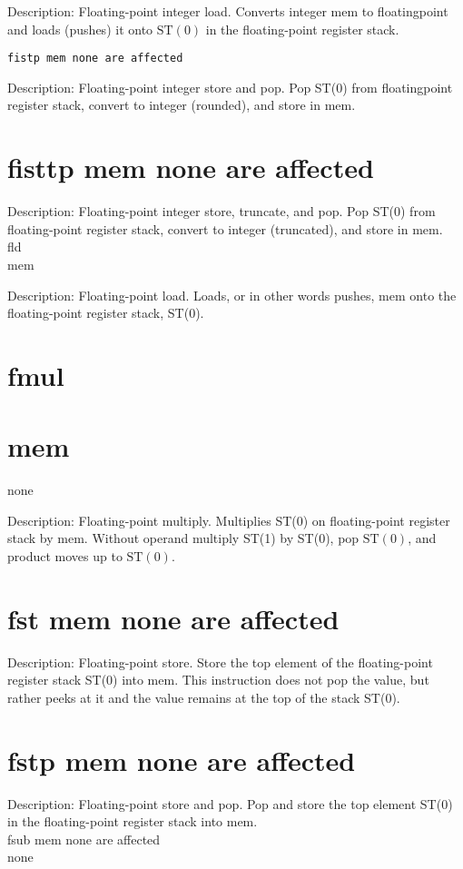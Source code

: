 \documentclass[10pt]{article}
\begin{document}
Description: Floating-point integer load. Converts integer mem to floatingpoint and loads (pushes) it onto $\mathrm{ST}(0)$ in the floating-point register stack.

\begin{verbatim}
fistp mem none are affected
\end{verbatim}

Description: Floating-point integer store and pop. Pop ST(0) from floatingpoint register stack, convert to integer (rounded), and store in mem.

\section*{fisttp mem none are affected}
Description: Floating-point integer store, truncate, and pop. Pop ST(0) from floating-point register stack, convert to integer (truncated), and store in mem.\\
fld\\
mem

Description: Floating-point load. Loads, or in other words pushes, mem onto the floating-point register stack, ST(0).

\section*{fmul}
\section*{mem}
none

Description: Floating-point multiply. Multiplies ST(0) on floating-point register stack by mem. Without operand multiply ST(1) by ST(0), pop $\mathrm{ST}(0)$, and product moves up to $\mathrm{ST}(0)$.

\section*{fst mem none are affected}
Description: Floating-point store. Store the top element of the floating-point register stack ST(0) into mem. This instruction does not pop the value, but rather peeks at it and the value remains at the top of the stack ST(0).

\section*{fstp mem none are affected}
Description: Floating-point store and pop. Pop and store the top element ST(0) in the floating-point register stack into mem.\\
fsub mem none are affected\\
none
\end{document}
